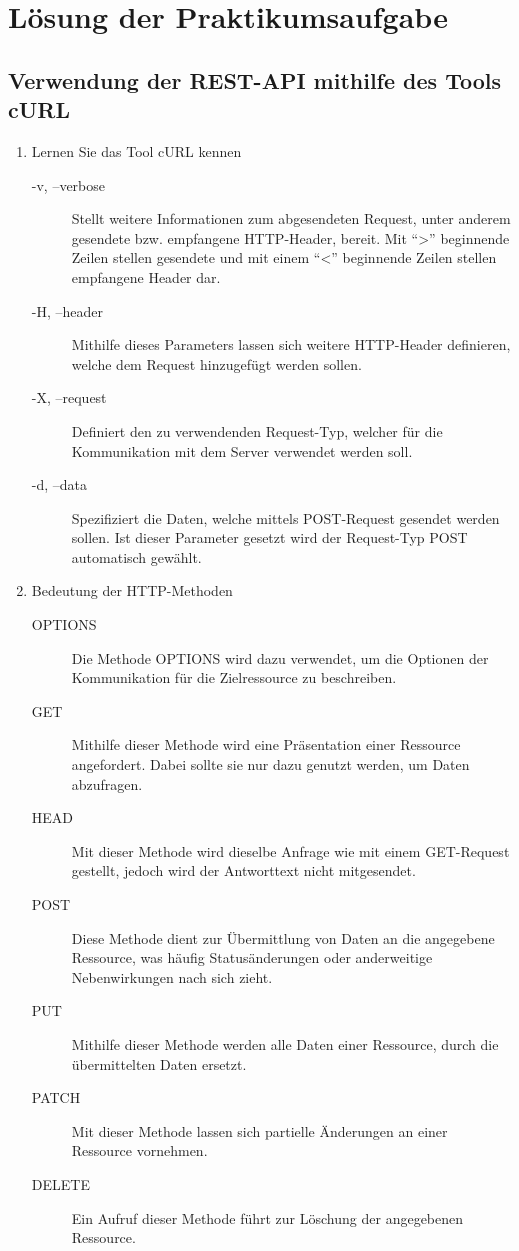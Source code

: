 \chapter{Lösung der Praktikumsaufgabe}
\section{Verwendung der REST-API mithilfe des Tools cURL}
\begin{enumerate}
	\item Lernen Sie das Tool cURL kennen
		\begin{description}
			\item[-v, --verbose] Stellt weitere Informationen zum abgesendeten Request, unter anderem gesendete bzw. empfangene \gls{HTTP}-Header, bereit. Mit \enquote{>} beginnende Zeilen stellen gesendete und mit einem \enquote{<} beginnende Zeilen stellen empfangene Header dar.
			\item[-H, --header] Mithilfe dieses Parameters lassen sich weitere \gls{HTTP}-Header definieren, welche dem Request hinzugefügt werden sollen.
			\item[-X, --request] Definiert den zu verwendenden Request-Typ, welcher für die Kommunikation mit dem Server verwendet werden soll.  
			\item[-d, --data] Spezifiziert die Daten, welche mittels POST-Request gesendet werden sollen. Ist dieser Parameter gesetzt wird der Request-Typ POST automatisch gewählt.
		\end{description}
	\item Bedeutung der HTTP-Methoden
		\begin{description}
			\item[OPTIONS] Die Methode OPTIONS wird dazu verwendet, um die Optionen der Kommunikation für die Zielressource zu beschreiben.
			\item[GET] Mithilfe dieser Methode wird eine Präsentation einer Ressource angefordert. Dabei sollte sie nur dazu genutzt werden, um Daten abzufragen.
			\item[HEAD] Mit dieser Methode wird dieselbe Anfrage wie mit einem GET-Request gestellt, jedoch wird der Antworttext nicht mitgesendet.
			\item[POST] Diese Methode dient zur Übermittlung von Daten an die angegebene Ressource, was häufig Statusänderungen oder anderweitige Nebenwirkungen nach sich zieht. 
			\item[PUT] Mithilfe dieser Methode werden alle Daten einer Ressource, durch die übermittelten Daten ersetzt.
			\item[PATCH] Mit dieser Methode lassen sich partielle Änderungen an einer Ressource vornehmen.
			\item[DELETE] Ein Aufruf dieser Methode führt zur Löschung der angegebenen Ressource.
		\end{description}
\end{enumerate}